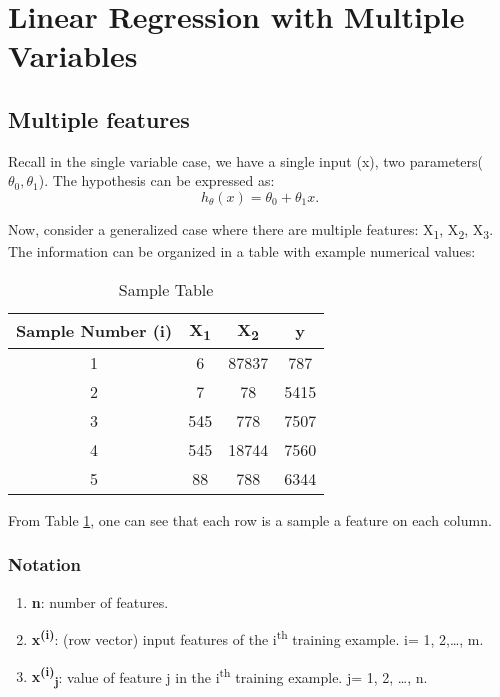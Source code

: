 \section{Linear Regression with Multiple Variables}

    \subsection{Multiple features}
    Recall in the single variable case, we have a single input (x), two parameters($\theta_0, \theta_1$). The hypothesis can be expressed as: \[
        h_\theta(x)= \theta_0 + \theta_1x
    .\] 
  
    Now, consider a generalized case where there are multiple features: X\textsubscript{1}, X\textsubscript{2}, X\textsubscript{3}. The information can be organized in a table with example numerical values:
    \begin{table}[htbp]
            \begin{center}
                 \begin{tabular}{||c c c c||} 
                 \hline
                  Sample Number (i) & X\textsubscript{1} &  X\textsubscript{2} & y \\ [0.5eX] 
                 \hline\hline
                 1 & 6 & 87837 & 787 \\ 
                 \hline
                 2 & 7 & 78 & 5415 \\
                 \hline
                 3 & 545 & 778 & 7507 \\
                 \hline
                 4 & 545 & 18744 & 7560 \\
                 \hline
                 5 & 88 & 788 & 6344 \\ [1ex] 
                 \hline
                \end{tabular}
             \caption{Sample Table}
             \label{tab:data}
         \end{center}
     \end{table}


        From Table \ref{tab:data}, one can see that each row is a sample a feature on each column.

    \subsubsection{Notation}

        \begin{enumerate}
            \item \textbf{n}: number of features.
            \item \textbf{x\textsuperscript{(i)}}: (row vector) input features of the i\textsuperscript{th} training example. i= 1, 2,\dots, m. 
            \item \textbf{x\textsuperscript{(i)}\textsubscript{j}}: value of feature j in the i\textsuperscript{th} training example. j= 1, 2, \dots, n.  

        \end{enumerate}

